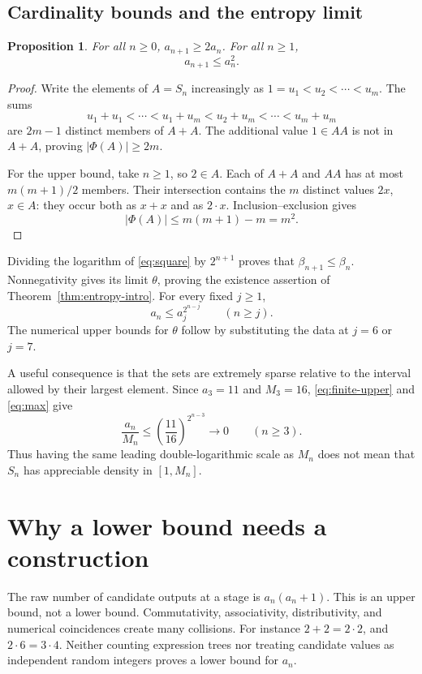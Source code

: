 \documentclass[11pt,a4paper]{article}
\newtheorem{proposition}[theorem]{Proposition}
\theoremstyle{definition}
\theoremstyle{remark}
\newcommand{\card}[1]{\lvert #1\rvert}
\begin{document}
\subsection{Cardinality bounds and the entropy limit}
\begin{proposition}\label{prop:cardbounds}
For all $n\ge0$, $a_{n+1}\ge2a_n$. For all $n\ge1$,
\begin{equation}\label{eq:square}
 a_{n+1}\le a_n^2.
\end{equation}
\end{proposition}
\begin{proof}
Write the elements of $A=S_n$ increasingly as
$1=u_1<u_2<\cdots<u_m$. The sums
\[
 u_1+u_1<\cdots<u_1+u_m<u_2+u_m<\cdots<u_m+u_m
\]
are $2m-1$ distinct members of $A+A$. The additional value $1\in AA$ is
not in $A+A$, proving $\card{\Phi(A)}\ge2m$.

For the upper bound, take $n\ge1$, so $2\in A$.
Each of $A+A$ and $AA$ has at most $m(m+1)/2$ members.
Their intersection contains the $m$ distinct values $2x$, $x\in A$:
they occur both as $x+x$ and as $2\cdot x$. Inclusion--exclusion gives
\[
 \card{\Phi(A)}\le m(m+1)-m=m^2.
\]
\end{proof}

Dividing the logarithm of \eqref{eq:square} by $2^{n+1}$ proves that
$\beta_{n+1}\le\beta_n$. Nonnegativity gives its limit $\theta$, proving
the existence assertion of Theorem~\ref{thm:entropy-intro}.
For every fixed $j\ge1$,
\begin{equation}\label{eq:finite-upper}
 a_n\le a_j^{2^{n-j}}\qquad(n\ge j).
\end{equation}
The numerical upper bounds for $\theta$ follow by substituting the data
at $j=6$ or $j=7$.

A useful consequence is that the sets are extremely sparse relative to
the interval allowed by their largest element. Since $a_3=11$ and
$M_3=16$, \eqref{eq:finite-upper} and \eqref{eq:max} give
\begin{equation}\label{eq:density}
 \frac{a_n}{M_n}\le\left(\frac{11}{16}\right)^{2^{n-3}}
 \longrightarrow0\qquad(n\ge3).
\end{equation}
Thus having the same leading double-logarithmic scale as $M_n$ does not
mean that $S_n$ has appreciable density in $[1,M_n]$.

\section{Why a lower bound needs a construction}\label{sec:collision}
The raw number of candidate outputs at a stage is $a_n(a_n+1)$.
This is an upper bound, not a lower bound. Commutativity, associativity,
distributivity, and numerical coincidences create many collisions.
For instance $2+2=2\cdot2$, and $2\cdot6=3\cdot4$.
Neither counting expression trees nor treating candidate values as
independent random integers proves a lower bound for $a_n$.
\end{document}
